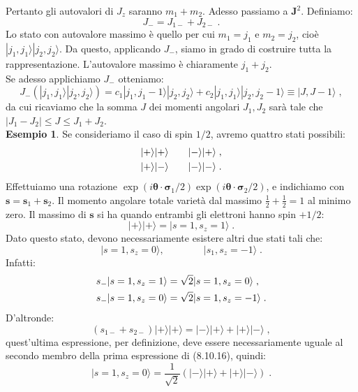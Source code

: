 \documentclass[10pt,a4paper]{report}
\theoremstyle{definition}
\numberwithin{equation}{section}
\newcommand{\ket}{\rangle}
\begin{document}
Pertanto gli autovalori di $J_z$ saranno $m_1+m_2$. Adesso passiamo a $\mathbf{J}^2$. Definiamo:
\begin{equation}
J_-=J_{1-}+J_{2-}\;.
\end{equation}
Lo stato con autovalore massimo è quello per cui $m_1=j_1$ e $m_2=j_2$, cioè $|j_1,j_1\ket|j_2,j_2\ket$. Da questo, applicando $J_-$, siamo in grado di costruire tutta la rappresentazione. L'autovalore massimo è chiaramente $j_1+j_2$. \\
Se adesso applichiamo $J_-$ otteniamo:
\begin{equation}
J_-(|j_1,j_1\ket|j_2,j_2\ket)=c_1|j_1,j_1-1\ket|j_2,j_2\ket+c_2|j_1,j_1\ket|j_2,j_2-1\ket\equiv |J,J-1\ket\;,
\end{equation}
da cui ricaviamo che la somma $J$ dei momenti angolari $J_1,J_2$ sarà tale che $|J_1-J_2|\le J\le J_1+J_2$. \\
\textbf{Esempio 1}. Se consideriamo il caso di spin $1/2$, avremo quattro stati possibili:
\begin{align}
|+\ket|+\ket &\qquad |-\ket|+\ket \notag\;, \\
|+\ket|-\ket &\qquad |-\ket|-\ket\;.
\end{align}
Effettuiamo una rotazione $\exp(i\boldsymbol{\theta}\cdot\boldsymbol{\sigma}_1/2)\exp(i\boldsymbol{\theta}\cdot\boldsymbol{\sigma}_2/2)$, e indichiamo con $\mathbf{s}=\mathbf{s}_1+\mathbf{s}_2$. Il momento angolare totale varietà dal massimo $\frac{1}{2}+\frac{1}{2}=1$ al minimo zero. Il massimo di $\mathbf{s}$ si ha quando entrambi gli elettroni hanno spin $+1/2$:
\begin{equation}
|+\ket|+\ket=|s=1,s_z=1\ket\;.
\end{equation}
Dato questo stato, devono necessariamente esistere altri due stati tali che:
\begin{equation}
|s=1,s_z=0\ket, \qquad \qquad |s_1,s_z=-1\ket\;.
\end{equation}
Infatti:
\begin{align}
s_-|s=1,s_z=1\ket&=\sqrt{2}|s=1,s_z=0\ket\;, \notag \\
s_-|s=1,s_z=0\ket&=\sqrt{2}|s=1,s_z=-1\ket\;.
\end{align}
D'altronde:
\begin{equation}
(s_{1-}+s_{2-})|+\ket|+\ket=|-\ket|+\ket+|+\ket|-\ket\;,
\end{equation}
quest'ultima espressione, per definizione, deve essere necessariamente uguale al secondo membro della prima espressione di (8.10.16), quindi:
\begin{equation}
|s=1,s_z=0\ket =\frac{1}{\sqrt{2}}(|-\ket|+\ket+|+\ket|-\ket)\;.
\end{equation}
\end{document}
